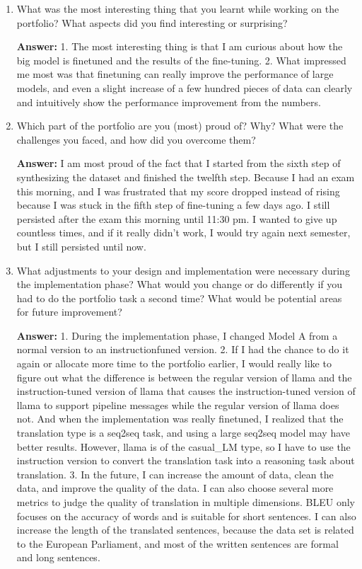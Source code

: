 \begin{enumerate}
    \item   What was the most interesting thing that you learnt while working on the portfolio?
            What aspects did you find interesting or surprising? 
    
    \textbf{Answer:}
    1. The most interesting thing is that I am curious about how the big model is fine\-tuned and the results of the fine-tuning.
    2. What impressed me most was that fine\-tuning can really improve the performance of large models, 
    and even a slight increase of a few hundred pieces of data can clearly and intuitively show the performance improvement from the numbers.
    
    \item   Which part of the portfolio are you (most) proud of?
            Why?
            What were the challenges you faced, and how did you overcome them? 

    \textbf{Answer:}
    I am most proud of the fact that I started from the sixth step of synthesizing the dataset and finished the twelfth step. 
    Because I had an exam this morning, and I was frustrated that my score dropped instead of rising 
    because I was stuck in the fifth step of fine-tuning a few days ago. 
    I still persisted after the exam this morning until 11:30 pm. 
    I wanted to give up countless times, and if it really didn't work, I would try again next semester, but I still persisted until now.

    \item   What adjustments to your design and implementation were necessary during the implementation phase?
            What would you change or do differently if you had to do the portfolio task a second time?
            What would be potential areas for future improvement?
    
    \textbf{Answer:}
    1. During the implementation phase, I changed Model A from a normal version to an instruction\-funed version.
    2. If I had the chance to do it again or allocate more time to the portfolio earlier, 
    I would really like to figure out what the difference is between the regular version of llama and 
    the instruction-tuned version of llama that causes the instruction-tuned version of llama 
    to support pipeline messages while the regular version of llama does not.
    And when the implementation was really fine\-tuned, I realized that the translation type is a seq2seq task, 
    and using a large seq2seq model may have better results. However, llama is of the casual\_LM type, 
    so I have to use the instruction version to convert the translation task into a reasoning task about translation.
    3. In the future, I can increase the amount of data, clean the data, and improve the quality of the data. 
    I can also choose several more metrics to judge the quality of translation in multiple dimensions. 
    BLEU only focuses on the accuracy of words and is suitable for short sentences. 
    I can also increase the length of the translated sentences, 
    because the data set is related to the European Parliament, and most of the written sentences are formal and long sentences.


\end{enumerate}
